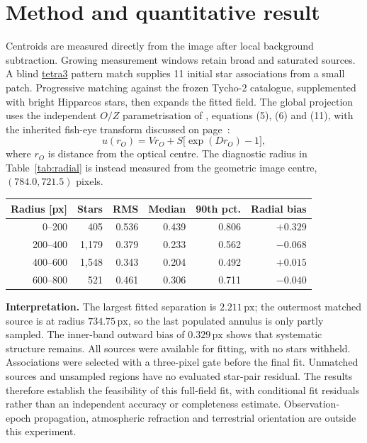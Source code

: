 \documentclass[12pt,a4paper]{article}
\newcommand{\px}{\,\mathrm{px}}
\begin{document}
\section*{Method and quantitative result}
Centroids are measured directly from the image after local background
subtraction. Growing measurement windows retain broad and saturated sources.
A blind \href{https://github.com/esa/tetra3}{tetra3} pattern match supplies
11 initial star associations from a small patch. Progressive matching against
the frozen Tycho-2 catalogue, supplemented with bright Hipparcos stars, then
expands the fitted field. The global projection uses the independent $O/Z$
parametrisation of \citet{barghini2019}, equations (5), (6) and (11), with
the inherited fish-eye transform discussed on page~\pageref{sec:lineage}:
\[
  u(r_O)=V r_O+S\bigl[\exp(D r_O)-1\bigr],
\]
where $r_O$ is distance from the optical centre. The diagnostic radius in
Table~\ref{tab:radial} is instead measured from the geometric image centre,
$(784.0,721.5)$ pixels.

\begin{center}
\label{tab:radial}
\smallskip
\begin{tabular}{@{}rrrrrr@{}}
\toprule
Radius [px] & Stars & RMS & Median & 90th pct. & Radial bias \\
\midrule
0--200   & 405   & 0.536 & 0.439 & 0.806 & $+0.329$ \\
200--400 & 1,179 & 0.379 & 0.233 & 0.562 & $-0.068$ \\
400--600 & 1,548 & 0.343 & 0.204 & 0.492 & $+0.015$ \\
600--800 & 521   & 0.461 & 0.306 & 0.711 & $-0.040$ \\
\bottomrule
\end{tabular}
\end{center}

\textbf{Interpretation.}
The largest fitted separation is $2.211\px$; the outermost matched source
is at radius $734.75\px$, so the last populated annulus is only partly
sampled. The inner-band outward bias of $0.329\px$ shows that systematic
structure remains. All sources were available for fitting, with no stars
withheld. Associations were selected with a three-pixel gate before the
final fit. Unmatched sources and unsampled regions have no evaluated
star-pair residual. The results therefore establish the feasibility of this
full-field fit, with conditional fit residuals rather than an independent
accuracy or completeness estimate. Observation-epoch propagation, atmospheric
refraction and terrestrial orientation are outside this experiment.
\end{document}
